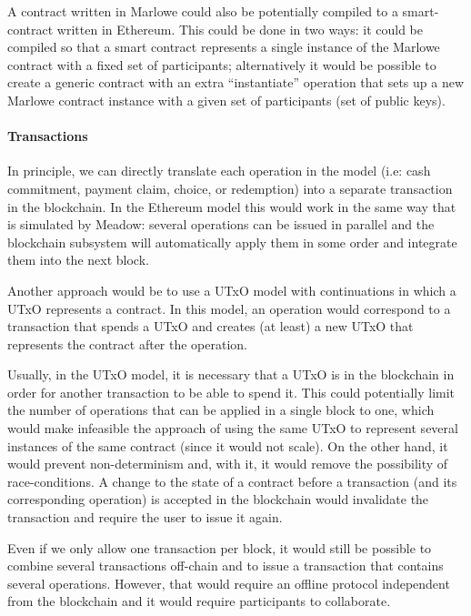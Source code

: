 \documentclass[runningheads]{llncs}
\begin{document}
A contract written in Marlowe could also be potentially
compiled to a smart-contract written in Ethereum. This could be done in two ways: it could be compiled so that a 
smart contract represents a single instance of the Marlowe contract with a fixed set of participants; 
alternatively it would be possible to create a generic contract with an extra ``instantiate'' operation that 
sets up a new Marlowe contract instance with a given set of participants (set of public keys).

\paragraph{Transactions}

In principle, we can directly translate each operation in the model (i.e: cash commitment, payment claim, choice, or
redemption) into a separate transaction in the blockchain. In the Ethereum model this would work in the same 
way that is simulated by Meadow: several operations can be issued in parallel and the blockchain subsystem will 
automatically apply them in some order and integrate them into the next block.

Another approach would be to use a UTxO model with continuations in which a UTxO represents a contract. In this model,
an operation would correspond to a transaction that spends a UTxO and creates (at least) a new UTxO that represents the 
contract after the operation.

Usually, in the UTxO model, it is necessary that a UTxO is in the blockchain in order for another transaction to be able to spend it. This could potentially limit the number of operations that can be applied in a single block to one, which would make infeasible the approach of using the same UTxO to represent several instances of the same contract (since it would not scale).
On the other hand, it would prevent non-determinism and, with it, it would remove the possibility of race-conditions. A change to the state of a contract before a transaction (and its corresponding operation) is accepted in the blockchain 
would invalidate the transaction and require the user to issue it again.

Even if we only allow one transaction per block, it would still be possible to combine several transactions off-chain 
and to issue a transaction that contains several operations. However, that would require an offline protocol 
independent from the blockchain and it would require participants to collaborate.
\end{document}
